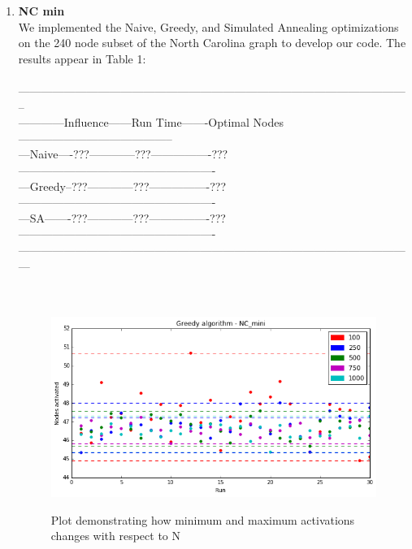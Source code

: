\documentclass[11pt]{scrartcl} %
\begin{document}
\begin{enumerate}
\item \textbf{NC min}\\
We implemented the Naive, Greedy, and Simulated Annealing optimizations on the 240 node subset of the North Carolina graph to develop our code.  The results appear in Table 1:\\\
\\
--------------------------------------------------------------------------------------------------------\\
------------Influence------Run Time-------Optimal Nodes-----------------------------------------\\
---Naive----???------------???----------------???----------------------------------------------------\\
---Greedy--???------------???----------------???----------------------------------------------------\\
---SA-------???------------???----------------???----------------------------------------------------\\
---------------------------------------------------------------------------------------------------------\\
\\
\\
\begin{figure}[h!]
\centering
\includegraphics[width=15 cm]{greedy_min}
\label{fig_sim}
\caption{Plot demonstrating how minimum and maximum activations changes with respect to N}
\label{fig:GA}
\end{figure}


\end{enumerate}
\end{document}
